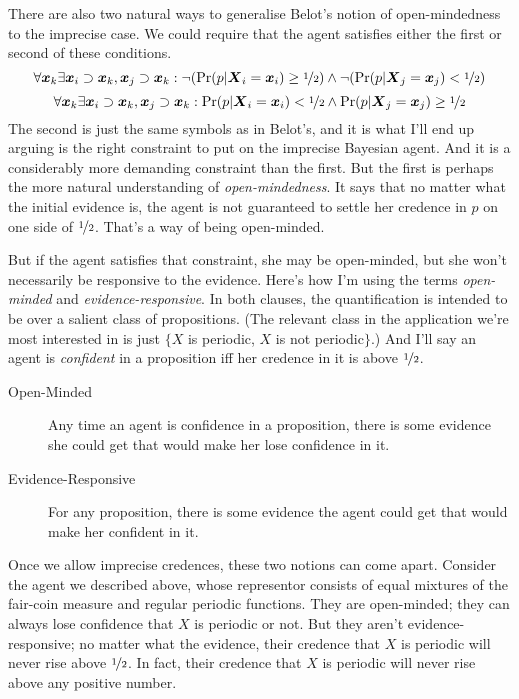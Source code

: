 \documentclass{ergoclass}
\newcommand{\vx}{\boldsymbol{x}}
\newcommand{\vX}{\boldsymbol{X}}
\begin{document}
There are also two natural ways to generalise Belot's notion of open-minded\-ness to the imprecise case. We could require that the agent satisfies either the first or second of these conditions.
%
%
$$
\forall \vx_k \exists \vx_i \supset \vx_k, \vx_j \supset \vx_k: \neg(\Pr(p | \vX_i = \vx_i) \geq \nicefrac{1}{2}) \wedge \neg(\Pr(p | \vX_j = \vx_j) < \nicefrac{1}{2})$$ $$
\forall \vx_k \exists \vx_i \supset \vx_k, \vx_j \supset \vx_k: \Pr(p | \vX_i = \vx_i) < \nicefrac{1}{2} \wedge \Pr(p | \vX_j = \vx_j) \geq \nicefrac{1}{2}
$$
%
%
The second is just the same symbols as in Belot's, and it is what I'll end up arguing is the right constraint to put on the imprecise Bayesian agent. And it is a considerably more demanding constraint than the first. But the first is perhaps the more natural understanding of \textit{open-mindedness}. It says that no matter what the initial evidence is, the agent is not guaranteed to settle her credence in $p$ on one side of $\nicefrac{1}{2}$. That's a way of being open-minded.

But if the agent satisfies that constraint, she may be open-minded, but she won't necessarily be responsive to the evidence. Here's how I'm using the terms \textit{open-minded} and \textit{evidence-responsive}. In both clauses, the quantification is intended to be over a salient class of propositions. (The relevant class in the application we're most interested in is just $\{X$ is periodic, $X$ is not periodic$\}$.) And I'll say an agent is \textit{confident} in a proposition iff her credence in it is above $\nicefrac{1}{2}$.

\begin{description}
\item[Open-Minded] Any time an agent is confidence in a proposition, there is some evidence she could get that would make her lose confidence in it.
\item[Evidence-Responsive] For any proposition, there is some evidence the agent could get that would make her confident in it.
\end{description}
%
Once we allow imprecise credences, these two notions can come apart. Consider the agent we described above, whose representor consists of equal mixtures of the fair-coin measure and regular periodic functions. They are open-minded; they can always lose confidence that $X$ is periodic or not. But they aren't evidence-responsive; no matter what the evidence, their credence that $X$ is periodic will never rise above $\nicefrac{1}{2}$. In fact, their credence that $X$ is periodic will never rise above any positive number. 
\end{document}
